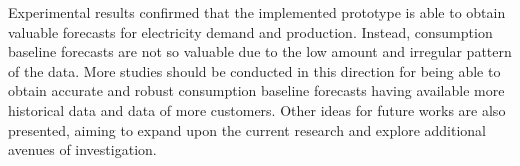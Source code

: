 Experimental results confirmed that the implemented prototype is able to obtain valuable forecasts for electricity demand and production.
Instead, consumption baseline forecasts are not so valuable due to the low amount and irregular pattern of the data.
More studies should be conducted in this direction for being able to obtain accurate and robust consumption baseline forecasts having available more historical data and data of more customers.
Other ideas for future works are also presented, aiming to expand upon the current research and explore additional avenues of investigation.
